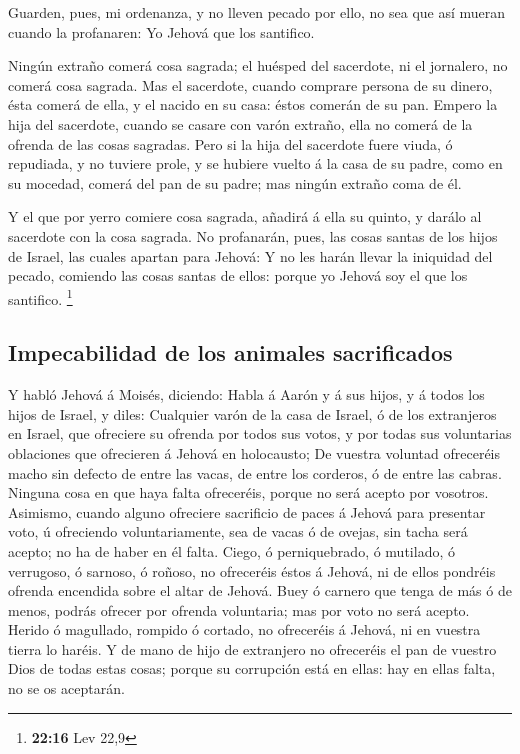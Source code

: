  Guarden, pues, mi ordenanza, y no lleven pecado por ello,
no sea que así mueran cuando la profanaren: Yo Jehová que los santifico.

 Ningún extraño comerá cosa sagrada; el huésped del
sacerdote, ni el jornalero, no comerá cosa sagrada.  Mas el
sacerdote, cuando comprare persona de su dinero, ésta comerá de ella, y
el nacido en su casa: éstos comerán de su pan.  Empero la
hija del sacerdote, cuando se casare con varón extraño, ella no comerá
de la ofrenda de las cosas sagradas.  Pero si la hija del
sacerdote fuere viuda, ó repudiada, y no tuviere prole, y se hubiere
vuelto á la casa de su padre, como en su mocedad, comerá del pan de su
padre; mas ningún extraño coma de él.

 Y el que por yerro comiere cosa sagrada, añadirá á ella su
quinto, y darálo al sacerdote con la cosa sagrada.  No
profanarán, pues, las cosas santas de los hijos de Israel, las cuales
apartan para Jehová:  Y no les harán llevar la iniquidad
del pecado, comiendo las cosas santas de ellos: porque yo Jehová soy el
que los santifico. \footnote{\textbf{22:16} Lev 22,9}

\hypertarget{impecabilidad-de-los-animales-sacrificados}{%
\subsection{Impecabilidad de los animales
sacrificados}\label{impecabilidad-de-los-animales-sacrificados}}

 Y habló Jehová á Moisés, diciendo:  Habla á
Aarón y á sus hijos, y á todos los hijos de Israel, y diles: Cualquier
varón de la casa de Israel, ó de los extranjeros en Israel, que
ofreciere su ofrenda por todos sus votos, y por todas sus voluntarias
oblaciones que ofrecieren á Jehová en holocausto;  De
vuestra voluntad ofreceréis macho sin defecto de entre las vacas, de
entre los corderos, ó de entre las cabras.  Ninguna cosa en
que haya falta ofreceréis, porque no será acepto por vosotros.
 Asimismo, cuando alguno ofreciere sacrificio de paces á
Jehová para presentar voto, ú ofreciendo voluntariamente, sea de vacas ó
de ovejas, sin tacha será acepto; no ha de haber en él falta.
 Ciego, ó perniquebrado, ó mutilado, ó verrugoso, ó
sarnoso, ó roñoso, no ofreceréis éstos á Jehová, ni de ellos pondréis
ofrenda encendida sobre el altar de Jehová.  Buey ó carnero
que tenga de más ó de menos, podrás ofrecer por ofrenda voluntaria; mas
por voto no será acepto.  Herido ó magullado, rompido ó
cortado, no ofreceréis á Jehová, ni en vuestra tierra lo haréis.
 Y de mano de hijo de extranjero no ofreceréis el pan de
vuestro Dios de todas estas cosas; porque su corrupción está en ellas:
hay en ellas falta, no se os aceptarán.

